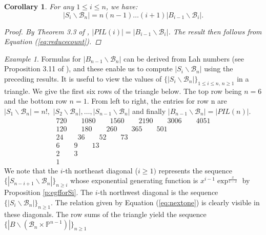 \documentclass[12pt]{amsart}
\numberwithin{equation}{section}
\newtheorem{cor}[thm]{Corollary}
\theoremstyle{remark}
\newtheorem{exam}[thm]{Example}
\theoremstyle{definition}
\newcommand{\B}{\mathcal{B}}
\begin{document}
\begin{cor}\label{c:Sirecursion}
For any $1\leq i\leq n$, we have: 
\begin{equation}\label{eq:orbitcount}
|S_{i}\backslash\B_{n}|=n(n-1)\dots (i+1) |B_{i-1}\backslash \B_{i}|.
\end{equation}
\begin{proof}
By Theorem 3.3 of \cite{CE21II}, $|PIL(i)|=|B_{i-1}\backslash\B_{i}|$.  The result then follows from Equation (\ref{eq:reducecount}).

\end{proof}
\end{cor}

\begin{exam}\label{ex:formulatable}
Formulas for $|B_{n-1}\backslash \B_n|$ can be derived from Lah numbers (see Proposition 3.11 of \cite{CE21II}), and these enable us to compute $|S_i\backslash \B_n|$ using the preceding results.   It is useful to view the values of
 $\{|S_{i}\backslash \B_{n}|\}_{1\leq i\leq n,\, n\geq 1}$ in a triangle.  We give the first six rows of the triangle below.  The top row being $n=6$ and the bottom row $n=1$.  From left to right, the entries for row n are $|S_{1}\backslash\B_{n}|=n!,$ $|S_{2}\backslash\B_{n}|, \dots, |S_{n-1}\backslash\B_{n}|$ and finally $|B_{n-1}\backslash\B_{n}|=|PIL(n)|$. 
\begin{gather*}
720 \qquad 1080 \qquad1560 \qquad 2190 \qquad 3006 \qquad 4051  \\
        120 \qquad 180  \qquad 260   \qquad 365  \qquad 501   \\
        24\qquad 36 \qquad 52\qquad 73 \\
        6 \qquad 9 \qquad 13 \\
        2\qquad 3 \\
        1 
\end{gather*}
We note that the $i$-th northeast diagonal ($i\geq 1)$ represents the sequence $\{|S_{n-i+1}\backslash\B_{n}|\}_{n\geq i}$ whose exponential generating function is $x^{i-1} \exp^{\frac{x}{1-x}}$ by Proposition \ref{p:egfforSi}. The $i$-th northwest diagonal is the sequence $\{|S_{i}\backslash\B_{n}|\}_{n\geq 1}$.  The relation given by Equation (\ref{eq:nextone}) is clearly visible in these diagonals.  The row sums of the triangle yield the sequence $\{|B\backslash(\B_{n}\times\mathbb{P}^{n-1})|\}_{n\geq 1}$ 


\end{exam}
\end{document}
